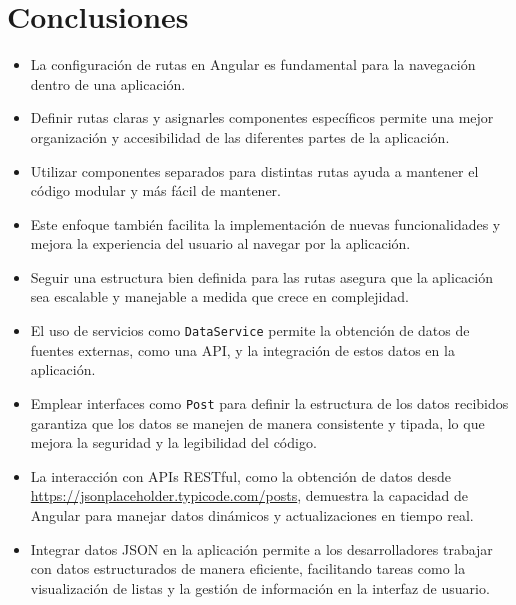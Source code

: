 \documentclass{article}
\begin{document}
  \section{Conclusiones}
  \begin{itemize}
    \item La configuración de rutas en Angular es fundamental para la navegación dentro de una aplicación.
    \item Definir rutas claras y asignarles componentes específicos permite una mejor organización y accesibilidad 
    de las diferentes partes de la aplicación.
    \item Utilizar componentes separados para distintas rutas ayuda a mantener el código modular y más fácil de mantener.
    \item Este enfoque también facilita la implementación de nuevas funcionalidades y mejora la experiencia del 
    usuario al navegar por la aplicación.
    \item Seguir una estructura bien definida para las rutas asegura que la aplicación sea escalable y manejable 
    a medida que crece en complejidad.
    \item El uso de servicios como \texttt{DataService} permite la obtención de datos de fuentes externas, como una 
    API, y la integración de estos datos en la aplicación.
    \item Emplear interfaces como \texttt{Post} para definir la estructura de los datos recibidos garantiza que los datos 
    se manejen de manera consistente y tipada, lo que mejora la seguridad y la legibilidad del código.
    \item La interacción con APIs RESTful, como la obtención de datos desde \url{https://jsonplaceholder.typicode.com/posts}, 
    demuestra la capacidad de Angular para manejar datos dinámicos y actualizaciones en tiempo real.
    \item Integrar datos JSON en la aplicación permite a los desarrolladores trabajar con datos estructurados de manera 
    eficiente, facilitando tareas como la visualización de listas y la gestión de información en la interfaz de usuario.
  \end{itemize}



	\newpage
\end{document}
